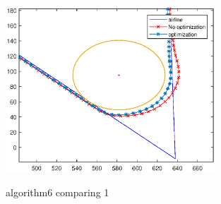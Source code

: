 \documentclass[UTF8,a4paper,10pt,nocolorlinks]{ctexart}
\begin{document}
\begin{figure}[htbp]
{\begin{minipage}[t]{0.48\linewidth}
                \centering
                    \includegraphics[width=0.7\textwidth]{picture/eps/algorithm7_2.eps}
                \label{fig:algo7_2}
            \end{minipage}
        }
        \caption{algorithm6 comparing 1}
    \end{figure}
    
\end{document}
